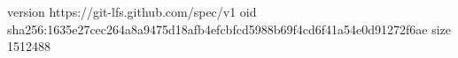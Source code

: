 version https://git-lfs.github.com/spec/v1
oid sha256:1635e27cec264a8a9475d18afb4efcbfcd5988b69f4cd6f41a54e0d91272f6ae
size 1512488
